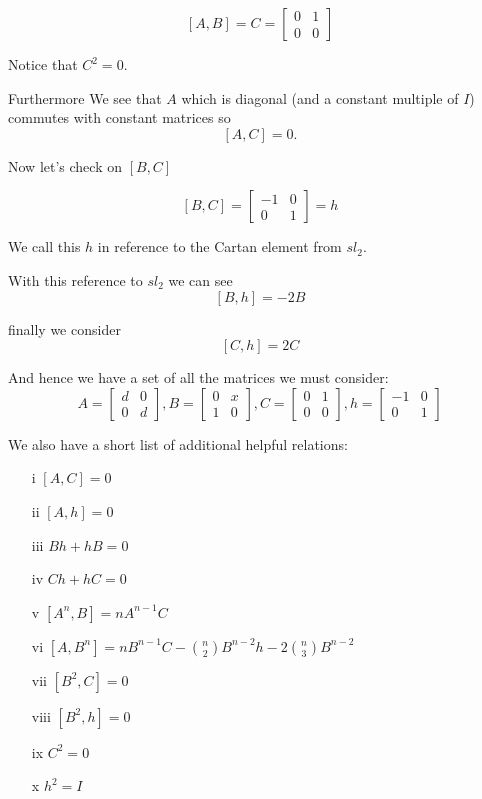 \documentclass{amsart}
\theoremstyle{definition}
\theoremstyle{remark}
\numberwithin{equation}{section}
\begin{document}
\[
[A,B] = C = \begin{bmatrix}
0 & 1\\ 0 & 0
\end{bmatrix}
\]

Notice that $C^2=0$.

Furthermore We see that $A$ which is diagonal (and a constant multiple of $I$) commutes with constant matrices so
\[
[A,C] = 0.
\]

Now let's check on $[B,C]$

\[
[B,C] = \begin{bmatrix}
-1 & 0\\
0 & 1
\end{bmatrix} = h
\]

We call this $h$ in reference to the Cartan element from $sl_2$.


With this reference to $sl_2$ we can see
\[
[B,h] = -2B
\]

finally we consider 
\[
[C,h] = 2C
\]

And hence we have a set of all the matrices we must consider:
\[
A=\begin{bmatrix}
d & 0\\
0 & d
\end{bmatrix},
B=\begin{bmatrix}
0 & x\\
1 & 0
\end{bmatrix},
C = \begin{bmatrix}
0 & 1\\
0 & 0
\end{bmatrix},
h = \begin{bmatrix}
-1 & 0\\
0 & 1
\end{bmatrix}
\]


We also have a short list of additional helpful relations:

\begin{itemize}
\item[i] $[A,C] = 0$\\
\item[ii] $[A,h] = 0$\\
\item[iii] $Bh+hB = 0$\\
\item[iv] $Ch+hC = 0$\\
\item[v] $[A^n,B]=nA^{n-1}C$\\
\item[vi] $[A,B^n] = nB^{n-1}C - \binom{n}{2}B^{n-2}h - 2\binom{n}{3}B^{n-2}$\\
\item[vii] $[B^2,C]=0$\\
\item[viii] $[B^2,h]=0$\\
\item[ix] $C^2=0$\\
\item[x] $h^2=I$
\end{itemize}
\end{document}
